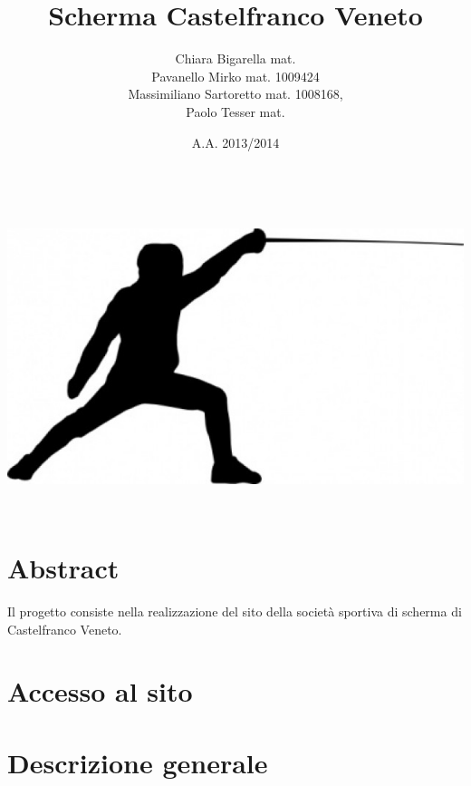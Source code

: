
	
\title{\bfseries Scherma Castelfranco Veneto}
\author{Chiara Bigarella mat. \\Pavanello Mirko mat. 1009424 \\Massimiliano Sartoretto mat. 1008168,\\ Paolo Tesser mat. }
\date{A.A. 2013/2014}


\maketitle
\vspace {20 mm}
\includegraphics[width=150mm, height=90mm]{images/frontImage.png}

\pagestyle{romano}
\newpage
	\tableofcontents
\newpage
	\listoffigures
\newpage
{}
\pagestyle{std}

\section{Abstract}
Il progetto consiste nella realizzazione del sito della societ\`a sportiva di scherma di Castelfranco Veneto.

\newpage
\section{Accesso al sito}
	

\newpage
\section{Descrizione generale}
	
	
